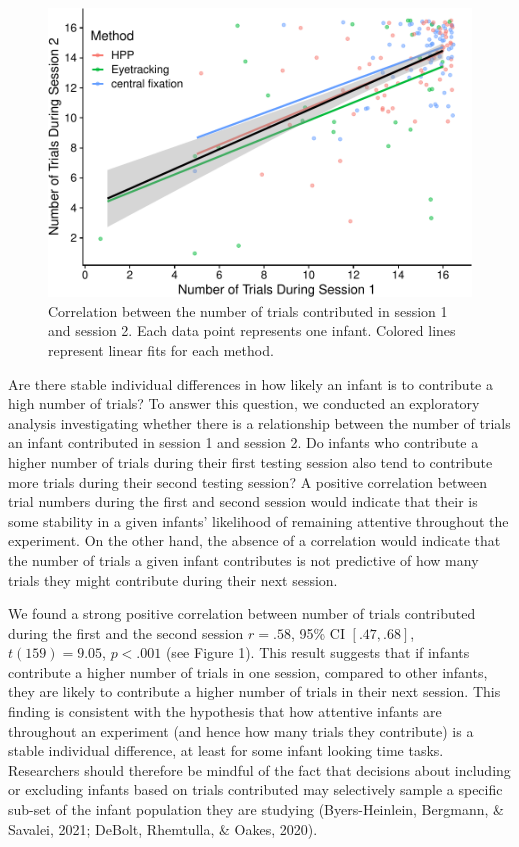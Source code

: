 \documentclass[
  man, donotrepeattitle,floatsintext]{apa6}
\begin{document}
\begin{figure}
\centering
\includegraphics{MB1T_supplement_files/figure-latex/sfig1-1.pdf}
\caption{\label{fig:sfig1}Correlation between the number of trials contributed in session 1 and session 2. Each data point represents one infant. Colored lines represent linear fits for each method.}
\end{figure}

Are there stable individual differences in how likely an infant is to contribute a high number of trials?
To answer this question, we conducted an exploratory analysis investigating whether there is a relationship between the number of trials an infant contributed in session 1 and session 2.
Do infants who contribute a higher number of trials during their first testing session also tend to contribute more trials during their second testing session?
A positive correlation between trial numbers during the first and second session would indicate that their is some stability in a given infants' likelihood of remaining attentive throughout the experiment.
On the other hand, the absence of a correlation would indicate that the number of trials a given infant contributes is not predictive of how many trials they might contribute during their next session.

We found a strong positive correlation between number of trials contributed during the first and the second session \(r = .58\), 95\% CI \([.47, .68]\), \(t(159) = 9.05\), \(p < .001\) (see Figure 1).
This result suggests that if infants contribute a higher number of trials in one session, compared to other infants, they are likely to contribute a higher number of trials in their next session.
This finding is consistent with the hypothesis that how attentive infants are throughout an experiment (and hence how many trials they contribute) is a stable individual difference, at least for some infant looking time tasks.
Researchers should therefore be mindful of the fact that decisions about including or excluding infants based on trials contributed may selectively sample a specific sub-set of the infant population they are studying (Byers-Heinlein, Bergmann, \& Savalei, 2021; DeBolt, Rhemtulla, \& Oakes, 2020).
\end{document}
